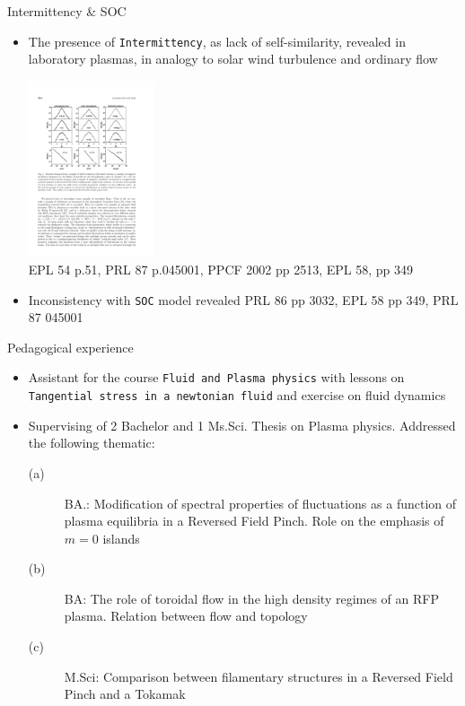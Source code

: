 \documentclass[t,10pt]{beamer}
\begin{document}
\begin{frame}{Intermittency \& SOC}
\begin{itemize}[<+->]
\item The presence of
  \textcolor{ta3chameleon}{\texttt{Intermittency}}, as lack of
  self-similarity, revealed in laboratory plasmas, in analogy to solar
  wind turbulence and ordinary flow

\begin{center}
\includegraphics[height=5.2cm]{global-intermittency} \\
{\tiny EPL 54 p.51, PRL 87 p.045001, PPCF 2002 pp 2513, EPL 58, pp 349 }
\end{center}

\item Inconsistency with
  \textcolor{ta3chameleon}{\texttt{SOC}} model revealed
{\tiny PRL 86 pp 3032, EPL 58 pp 349, PRL 87 045001 }
\end{itemize}
\end{frame}




\begin{frame}{Pedagogical experience}
\begin{itemize}
\item Assistant for the course \textcolor{ta3chameleon}{\texttt{Fluid and Plasma physics} }with
  lessons on \textcolor{ta3chameleon}{\texttt{Tangential stress in a newtonian fluid}} and
  exercise on fluid dynamics
\item Supervising of 2 Bachelor and 1 Ms.Sci. Thesis on Plasma
  physics. Addressed the following thematic:
\begin{description}
\item[(a)] BA.: Modification of spectral properties of fluctuations as a
  function of plasma equilibria in a Reversed Field Pinch. Role on the
  emphasis of $m=0$ islands
\item[(b)] BA: The role of toroidal flow in the high density regimes
  of an RFP plasma. Relation between flow and topology
\item[(c)] M.Sci: Comparison between filamentary structures in a
  Reversed Field Pinch and a Tokamak
\end{description}
\end{itemize}
\end{frame}
\end{document}
